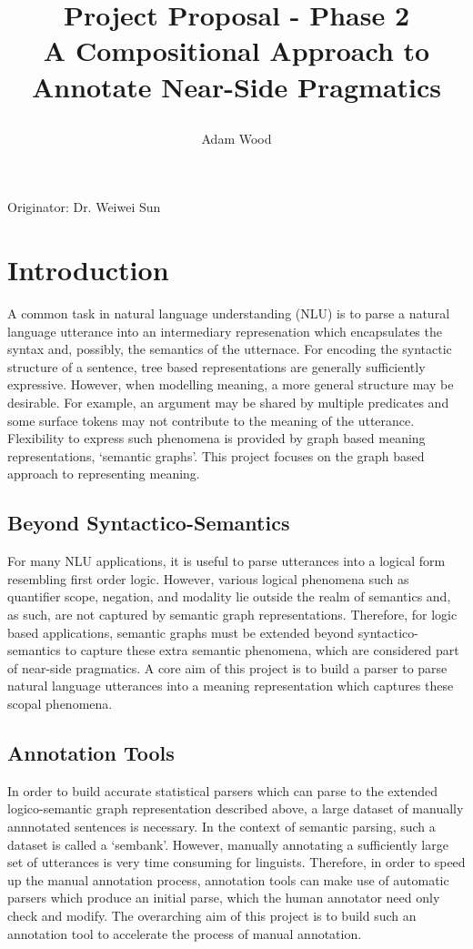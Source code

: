 \documentclass{article}
\title{    
    Project Proposal - Phase 2 \\
    A Compositional Approach to Annotate Near-Side Pragmatics

    }
\author{Adam Wood}
\begin{document}
\maketitle

\large Originator: Dr. Weiwei Sun


\section{Introduction}

A common task in natural language understanding (NLU) is to parse a natural language utterance into an intermediary represenation which encapsulates the syntax and, possibly, the semantics of the utternace. For encoding the syntactic structure of a sentence, tree based representations are generally sufficiently expressive. However, when modelling meaning, a more general structure may be desirable. For example, an argument may be shared by multiple predicates and some surface tokens may not contribute to the meaning of the utterance. Flexibility to express such phenomena is provided by graph based meaning representations, `semantic graphs'. This project focuses on the graph based approach to representing meaning. 

\subsection{Beyond Syntactico-Semantics}

For many NLU applications, it is useful to parse utterances into a logical form resembling first order logic. However, various logical phenomena such as quantifier scope, negation, and modality lie outside the realm of semantics and, as such, are not captured by semantic graph representations. Therefore, for logic based applications, semantic graphs must be extended beyond syntactico-semantics to capture these extra semantic phenomena, which are considered part of near-side pragmatics. A core aim of this project is to build a parser to parse natural language utterances into a meaning representation which captures these scopal phenomena.

\subsection{Annotation Tools}

In order to build accurate statistical parsers which can parse to the extended logico-semantic graph representation described above, a large dataset of manually annnotated sentences is necessary. In the context of semantic parsing, such a dataset is called a `sembank'. However, manually annotating a sufficiently large set of utterances is very time consuming for linguists. Therefore, in order to speed up the manual annotation process, annotation tools can make use of automatic parsers which produce an initial parse, which the human annotator need only check and modify. The overarching aim of this project is to build such an annotation tool to accelerate the process of manual annotation.
\end{document}
